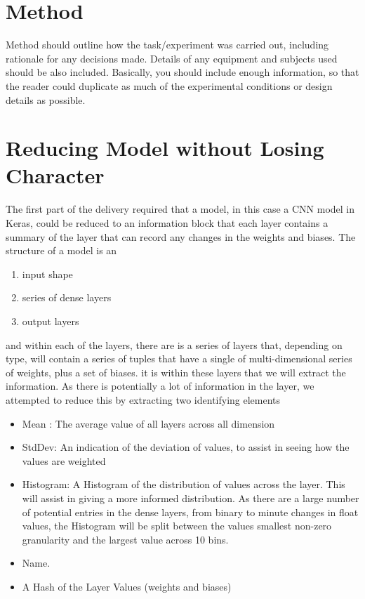 \section{Method}
Method should outline how the task/experiment was carried out, including rationale for any decisions made. Details of any equipment and subjects used should be also included. Basically, you should include enough information, so that the reader could duplicate as much of the experimental conditions or design details as possible.

\section{Reducing Model without Losing Character}
The first part of the delivery required that a model, in this case a CNN model in Keras, could be reduced to an information block that each layer contains a summary of the layer that can record any changes in the weights and biases. The structure of a model is an 
\begin{enumerate}
\item input shape
\item series of dense layers
\item output layers
\end{enumerate}

and within each of the layers, there are is a series of layers that, depending on type, will contain a series of tuples that have a single of multi-dimensional series of weights, plus a set of biases. it is within these layers that we will extract the information. As there is potentially a lot of information in the layer, we attempted to reduce this by extracting two identifying elements


\begin{itemize}
    \item Mean : The average value of all layers across all dimension
    \item StdDev: An indication of the deviation of values, to assist in seeing how the values are weighted
    \item Histogram: A Histogram of the distribution of values across the layer. This will assist in giving a more informed distribution. As there are a large number of potential entries in the dense layers, from binary to minute changes in float values, the Histogram will be split between the values smallest non-zero granularity and the largest value across 10 bins.
    \item Name.
    \item A Hash of the Layer Values (weights and biases)
\end{itemize}

